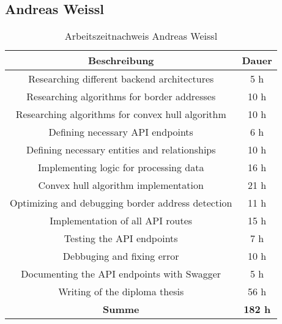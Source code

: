 \newpage

\subsection{Andreas Weissl}

\begin{table}[H]
  \centering
  \begin{tabular}{|c|c|}
  \hline
  \multicolumn{1}{|c|}{\textbf{Beschreibung}}  &
  \multicolumn{1}{c|}{\textbf{Dauer}}  \\ \hline
    Researching different backend architectures & 5 h \\ \hline
    Researching algorithms for border addresses & 10 h \\ \hline
    Researching algorithms for convex hull algorithm & 10 h \\ \hline
    Defining necessary API endpoints & 6 h \\ \hline
    Defining necessary entities and relationships & 10 h \\ \hline
    Implementing logic for processing data & 16 h \\ \hline
    Convex hull algorithm implementation & 21 h \\ \hline
    Optimizing and debugging border address detection & 11 h \\ \hline
    Implementation of all API routes & 15 h \\ \hline
    Testing the API endpoints & 7 h \\ \hline
    Debbuging and fixing error & 10 h \\ \hline
    Documenting the API endpoints with Swagger & 5 h \\ \hline
    Writing of the diploma thesis & 56 h \\ \hline
    {\textbf{Summe}} & \textbf{182 h} \\ \hline
   \end{tabular}
  \caption{Arbeitszeitnachweis Andreas Weissl}
  \end{table}

\newpage




 